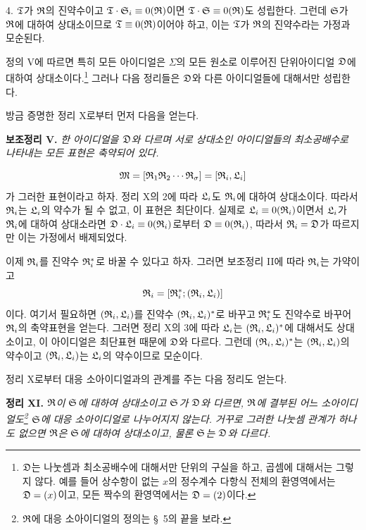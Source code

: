 4. $\mathfrak{T}$가 $\mathfrak{R}$의 진약수이고 $\mathfrak{T}\cdot\mathfrak{S}_i\equiv0(\mathfrak{R})$이면 $\mathfrak{T}\cdot\mathfrak{S}\equiv0(\mathfrak{R})$도 성립한다. 그런데 $\mathfrak{S}$가 $\mathfrak{R}$에 대하여 상대소이므로 $\mathfrak{T}\equiv0(\mathfrak{R})$이어야 하고, 이는 $\mathfrak{T}$가 $\mathfrak{R}$의 진약수라는 가정과 모순된다.

정의 V에 따르면 특히 모든 아이디얼은 $\Sigma$의 모든 원소로 이루어진 단위아이디얼 $\mathfrak{D}$에 대하여 상대소이다.\footnote{$\mathfrak{D}$는 나눗셈과 최소공배수에 대해서만 단위의 구실을 하고, 곱셈에 대해서는 그렇지 않다. 예를 들어 상수항이 없는 $x$의 정수계수 다항식 전체의 환영역에서는 $\mathfrak{D}=(x)$이고, 모든 짝수의 환영역에서는 $\mathfrak{D}=(2)$이다.} 그러나 다음 정리들은 $\mathfrak{D}$와 다른 아이디얼들에 대해서만 성립한다.

방금 증명한 정리 X로부터 먼저 다음을 얻는다.

\textbf{보조정리 V.} \emph{한 아이디얼을 $\mathfrak{D}$와 다르며 서로 상대소인 아이디얼들의 최소공배수로 나타내는 모든 표현은 축약되어 있다.}

\[
 \mathfrak{M}=[\mathfrak{R}_1\mathfrak{R}_2\cdots\mathfrak{R}_\sigma]=[\mathfrak{R}_i,\mathfrak{L}_i]
\]
가 그러한 표현이라고 하자. 정리 X의 2에 따라 $\mathfrak{L}_i$도 $\mathfrak{R}_i$에 대하여 상대소이다. 따라서 $\mathfrak{R}_i$는 $\mathfrak{L}_i$의 약수가 될 수 없고, 이 표현은 최단이다. 실제로 $\mathfrak{L}_i\equiv0(\mathfrak{R}_i)$이면서 $\mathfrak{L}_i$가 $\mathfrak{R}_i$에 대하여 상대소라면 $\mathfrak{D}\cdot\mathfrak{L}_i\equiv0(\mathfrak{R}_i)$로부터 $\mathfrak{D}\equiv0(\mathfrak{R}_i)$, 따라서 $\mathfrak{R}_i=\mathfrak{D}$가 따르지만 이는 가정에서 배제되었다.

이제 $\mathfrak{R}_i$를 진약수 $\mathfrak{R}_i^*$로 바꿀 수 있다고 하자. 그러면 보조정리 II에 따라 $\mathfrak{R}_i$는 가약이고
\[
 \mathfrak{R}_i=[\mathfrak{R}_i^*;(\mathfrak{R}_i,\mathfrak{L}_i)]
\]
이다. 여기서 필요하면 $(\mathfrak{R}_i,\mathfrak{L}_i)$를 진약수 $(\mathfrak{R}_i,\mathfrak{L}_i)^*$로 바꾸고 $\mathfrak{R}_i^*$도 진약수로 바꾸어 $\mathfrak{R}_i$의 축약표현을 얻는다. 그러면 정리 X의 3에 따라 $\mathfrak{L}_i$는 $(\mathfrak{R}_i,\mathfrak{L}_i)^*$에 대해서도 상대소이고, 이 아이디얼은 최단표현 때문에 $\mathfrak{D}$와 다르다. 그런데 $(\mathfrak{R}_i,\mathfrak{L}_i)^*$는 $(\mathfrak{R}_i,\mathfrak{L}_i)$의 약수이고 $(\mathfrak{R}_i,\mathfrak{L}_i)$는 $\mathfrak{L}_i$의 약수이므로 모순이다.

정리 X로부터 대응 소아이디얼과의 관계를 주는 다음 정리도 얻는다.

\textbf{정리 XI.} \emph{$\mathfrak{R}$이 $\mathfrak{S}$에 대하여 상대소이고 $\mathfrak{S}$가 $\mathfrak{D}$와 다르면, $\mathfrak{R}$에 결부된 어느 소아이디얼도\footnote{$\mathfrak{R}$에 대응 소아이디얼의 정의는 \S~5의 끝을 보라.} $\mathfrak{S}$에 대응 소아이디얼로 나누어지지 않는다. 거꾸로 그러한 나눗셈 관계가 하나도 없으면 $\mathfrak{R}$은 $\mathfrak{S}$에 대하여 상대소이고, 물론 $\mathfrak{S}$는 $\mathfrak{D}$와 다르다.}

